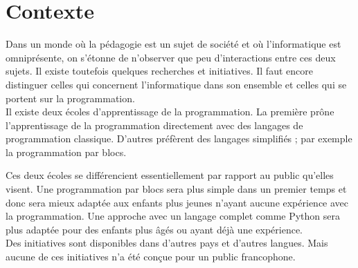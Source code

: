 \section{Contexte}
\label{intro-context}
Dans un monde où la pédagogie est un sujet de société et où l'informatique est omniprésente, on s'étonne de n'observer que peu d'interactions entre ces deux sujets. Il existe toutefois quelques recherches et initiatives. Il faut encore distinguer celles qui concernent l'informatique dans son ensemble et celles qui se portent sur la programmation.\\

Il existe deux écoles d'apprentissage de la programmation. La première prône l'apprentissage de la programmation directement avec des langages de programmation classique. D'autres préfèrent des langages simplifiés ; par exemple la programmation par \glspl{bloc}.

Ces deux écoles se différencient essentiellement par rapport au public qu'elles visent. Une programmation par \glspl{bloc} sera plus simple dans un premier temps et donc sera mieux adaptée aux enfants plus jeunes n'ayant aucune expérience avec la programmation. Une approche avec un langage complet comme Python sera plus adaptée pour des enfants plus âgés ou ayant déjà une expérience.\\

Des initiatives sont disponibles dans d'autres pays et d'autres langues. Mais aucune de ces initiatives n'a été conçue pour un public francophone.




